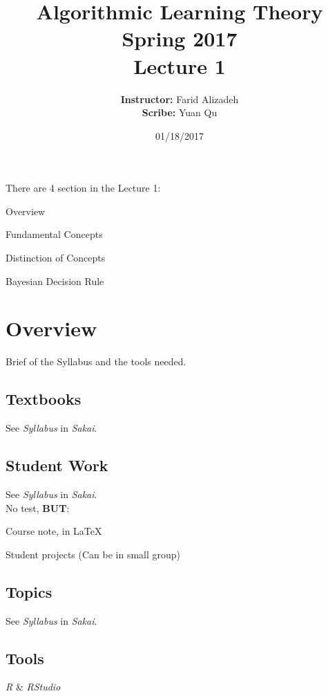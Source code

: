 \documentclass{article}
\title{ 
    Algorithmic Learning Theory\\
    Spring 2017\\
    Lecture 1
}
\author{
    {\bf Instructor:} Farid Alizadeh\\
    {\bf Scribe:} Yuan Qu
}
\date{01/18/2017}
\begin{document}
\pagestyle{fancy}

\maketitle

\medskip

There are 4 section in the Lecture 1:
\begin{enumerate}{
    \item Overview
    \item Fundamental Concepts
    \item Distinction of Concepts
    \item Bayesian Decision Rule  
}
\end{enumerate}

\clearpage

\section{Overview}{
    Brief of the Syllabus and the tools needed.
    \subsection{Textbooks}{
        See \textit{Syllabus} in \textit{Sakai}.
    }
    \subsection{Student Work}{
        See \textit{Syllabus} in \textit{Sakai}.\\
        No test, \textbf{BUT}:
        \begin{enumerate}{
            \item Course note, in LaTeX
            \item Student projects (Can be in small group)  
        }
        \end{enumerate}
    }
    \subsection{Topics}{
        See \textit{Syllabus} in \textit{Sakai}.
    }
    \subsection{Tools}{
        \textit{R} \& \textit{RStudio}
    }
}
\end{document}
